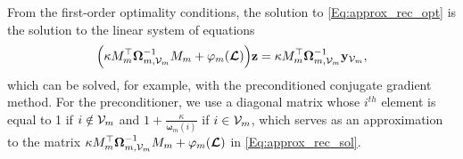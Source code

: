 \documentclass[journal, 10pt]{IEEEtran}
\begin{document}
From the first-order optimality conditions, the solution to \eqref{Eq:approx_rec_opt} is the solution to the linear system of equations
\begin{align}\label{Eq:approx_rec_sol}
\Bigl(\kappa M_m^{\top}{\boldsymbol \Omega}_{m,\V_m}^{-1}M_m+\varphi_m(\L)\Bigr){\bf  z}=\kappa M_m^{\top}{\boldsymbol \Omega}_{m,\V_m}^{-1}{\bf y}_{\V_m},
\end{align}
which can be solved, for example, with the preconditioned conjugate gradient method. For the preconditioner, we use a diagonal matrix whose $i^{th}$ element is equal to 1 if $i \notin {{\mathcal{V}}_m}$ and $1+\frac{\kappa}{{\boldsymbol \omega}_m(i)}$ if $i \in {{\mathcal{V}}_m}$, which serves as an approximation to the matrix $\kappa M_m^{\top}{\boldsymbol \Omega}_{m,{\mathcal{V}}_m}^{-1}M_m+\varphi_m(\boldsymbol{\mathcal{L}})$ in \eqref{Eq:approx_rec_sol}.


\end{document}
